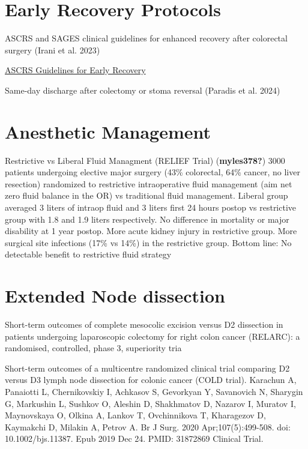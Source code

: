 \documentclass[
  letterpaper,
]{scrbook}
\begin{document}
\section{Early Recovery Protocols}\label{early-recovery-protocols}

ASCRS and SAGES clinical guidelines for enhanced recovery after
colorectal surgery (Irani et al. 2023)

\href{https://fascrs.org/ascrs/media/files/downloads/Clinical\%20Practice\%20Guidelines/clinical_practice_guidelines_for_enhanced_recovery-3.pdf}{ASCRS
Guidelines for Early Recovery}

Same-day discharge after colectomy or stoma reversal (Paradis et al.
2024)

\section{Anesthetic Management}\label{anesthetic-management}

Restrictive vs Liberal Fluid Managment (RELIEF Trial)
(\textbf{myles378?}) 3000 patients undergoing elective major surgery
(43\% colorectal, 64\% cancer, no liver resection) randomized to
restrictive intraoperative fluid management (aim net zero fluid balance
in the OR) vs traditional fluid management. Liberal group averaged 3
liters of intraop fluid and 3 liters first 24 hours postop vs
restrictive group with 1.8 and 1.9 liters respectively. No difference in
mortality or major disability at 1 year postop. More acute kidney injury
in restrictive group. More surgical site infections (17\% vs 14\%) in
the restrictive group. Bottom line: No detectable benefit to restrictive
fluid strategy

\section{Extended Node dissection}\label{extended-node-dissection}

Short-term outcomes of complete mesocolic excision versus D2 dissection
in patients undergoing laparoscopic colectomy for right colon cancer
(RELARC): a randomised, controlled, phase 3, superiority tria

Short-term outcomes of a multicentre randomized clinical trial comparing
D2 versus D3 lymph node dissection for colonic cancer (COLD trial).
Karachun A, Panaiotti L, Chernikovskiy I, Achkasov S, Gevorkyan Y,
Savanovich N, Sharygin G, Markushin L, Sushkov O, Aleshin D, Shakhmatov
D, Nazarov I, Muratov I, Maynovskaya O, Olkina A, Lankov T, Ovchinnikova
T, Kharagezov D, Kaymakchi D, Milakin A, Petrov A. Br J Surg. 2020
Apr;107(5):499-508. doi: 10.1002/bjs.11387. Epub 2019 Dec 24. PMID:
31872869 Clinical Trial.
\end{document}
